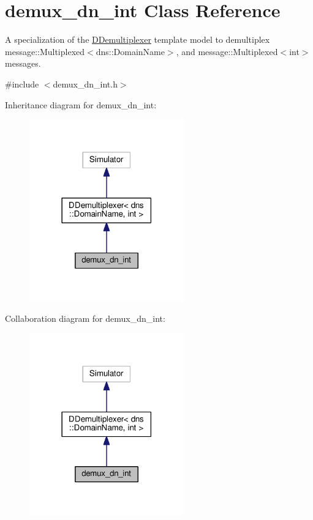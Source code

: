 \hypertarget{classdemux__dn__int}{}\section{demux\+\_\+dn\+\_\+int Class Reference}
\label{classdemux__dn__int}


A specialization of the \hyperlink{classDDemultiplexer}{D\+Demultiplexer} template model to demultiplex message\+::\+Multiplexed$<$dns\+::\+Domain\+Name$>$, and message\+::\+Multiplexed$<$int$>$ messages.  




{\ttfamily \#include $<$demux\+\_\+dn\+\_\+int.\+h$>$}



Inheritance diagram for demux\+\_\+dn\+\_\+int\+:\nopagebreak
\begin{figure}[H]
\begin{center}
\leavevmode
\includegraphics[width=189pt]{classdemux__dn__int__inherit__graph}
\end{center}
\end{figure}


Collaboration diagram for demux\+\_\+dn\+\_\+int\+:\nopagebreak
\begin{figure}[H]
\begin{center}
\leavevmode
\includegraphics[width=189pt]{classdemux__dn__int__coll__graph}
\end{center}
\end{figure}
